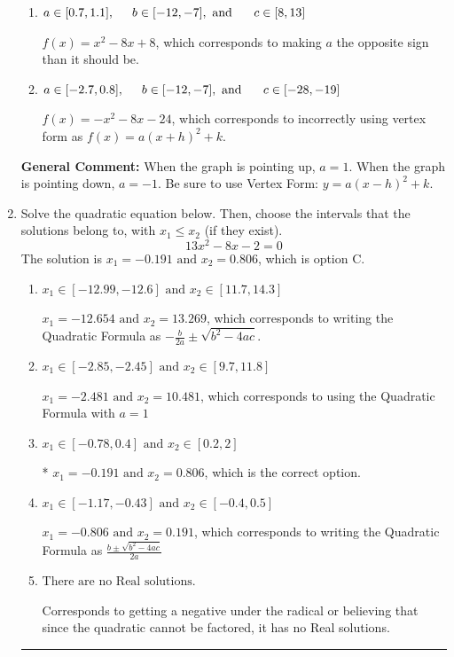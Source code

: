 \documentclass{extbook}[14pt]
\newcommand{\litem}[1]{\item #1

\rule{\textwidth}{0.4pt}}
\begin{document}
\begin{enumerate}
{\begin{enumerate}[label=\Alph*.]
$f(x)=-x^{2} -8 x -8$, which corresponds to incorrectly using vertex form as $f(x) = a(x+h)^2 - k$.
\item \( a \in [0.7, 1.1], \hspace*{5mm} b \in [-12, -7], \text{ and } \hspace*{5mm} c \in [8, 13] \)

$f(x)=x^{2} -8 x + 8$, which corresponds to making $a$ the opposite sign than it should be.
\item \( a \in [-2.7, 0.8], \hspace*{5mm} b \in [-12, -7], \text{ and } \hspace*{5mm} c \in [-28, -19] \)

$f(x)=-x^{2} -8 x -24$, which corresponds to incorrectly using vertex form as $f(x) = a(x+h)^2+k$.
\end{enumerate}

\textbf{General Comment:} When the graph is pointing up, $a=1$. When the graph is pointing down, $a=-1$. Be sure to use Vertex Form: $y = a(x-h)^2+k$.
}
\litem{
Solve the quadratic equation below. Then, choose the intervals that the solutions belong to, with $x_1 \leq x_2$ (if they exist).
\[ 13x^{2} -8 x -2 = 0 \]The solution is \( x_1 = -0.191 \text{ and } x_2 = 0.806 \), which is option C.\begin{enumerate}[label=\Alph*.]
\item \( x_1 \in [-12.99, -12.6] \text{ and } x_2 \in [11.7, 14.3] \)

 $x_1 = -12.654 \text{ and } x_2 = 13.269$, which corresponds to writing the Quadratic Formula as $-\frac{b}{2a} \pm \sqrt{b^2 - 4ac}$.
\item \( x_1 \in [-2.85, -2.45] \text{ and } x_2 \in [9.7, 11.8] \)

 $x_1 = -2.481 \text{ and } x_2 = 10.481$, which corresponds to using the Quadratic Formula with $a=1$
\item \( x_1 \in [-0.78, 0.4] \text{ and } x_2 \in [0.2, 2] \)

* $x_1 = -0.191 \text{ and } x_2 = 0.806$, which is the correct option.
\item \( x_1 \in [-1.17, -0.43] \text{ and } x_2 \in [-0.4, 0.5] \)

 $x_1 = -0.806 \text{ and } x_2 = 0.191$, which corresponds to writing the Quadratic Formula as $\frac{b \pm \sqrt{b^2 - 4ac}}{2a}$
\item \( \text{There are no Real solutions.} \)

Corresponds to getting a negative under the radical or believing that since the quadratic cannot be factored, it has no Real solutions.
\end{enumerate}

}
\end{enumerate}
\end{document}
